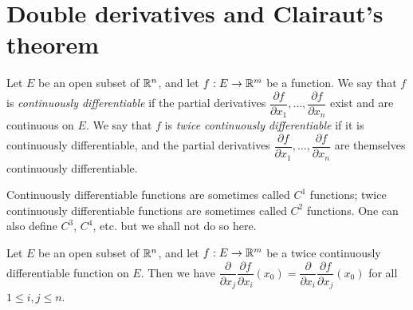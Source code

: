 \section{Double derivatives and Clairaut's theorem}\label{ii:sec:6.5}

\begin{defn}\label{ii:6.5.1}
  Let \(E\) be an open subset of \(\mathbb{R}^n\), and let \(f : E \to \mathbb{R}^m\) be a function.
  We say that \(f\) is \emph{continuously differentiable} if the partial derivatives \(\dfrac{\partial f}{\partial x_1}, \dots, \dfrac{\partial f}{\partial x_n}\) exist and are continuous on \(E\).
  We say that \(f\) is \emph{twice continuously differentiable} if it is continuously differentiable, and the partial derivatives \(\dfrac{\partial f}{\partial x_1}, \dots, \dfrac{\partial f}{\partial x_n}\) are themselves continuously differentiable.
\end{defn}

\begin{rmk}\label{ii:6.5.2}
  Continuously differentiable functions are sometimes called \(C^1\) functions;
  twice continuously differentiable functions are sometimes called \(C^2\) functions.
  One can also define \(C^3\), \(C^4\), etc. but we shall not do so here.
\end{rmk}

\setcounter{thm}{3}
\begin{thm}\label{ii:6.5.4}
  Let \(E\) be an open subset of \(\mathbb{R}^n\), and let \(f : E \to \mathbb{R}^m\) be a twice continuously differentiable function on \(E\).
  Then we have \(\dfrac{\partial}{\partial x_j} \dfrac{\partial f}{\partial x_i}(x_0) = \dfrac{\partial}{\partial x_i} \dfrac{\partial f}{\partial x_j}(x_0)\) for all \(1 \leq i, j \leq n\).
\end{thm}

